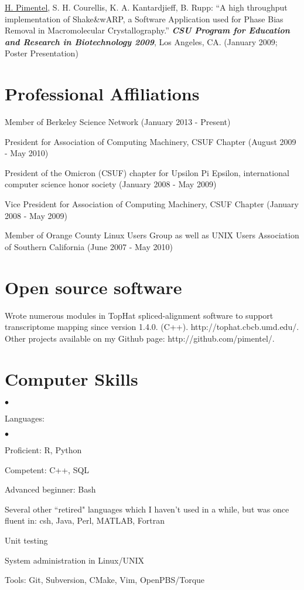 \documentclass[margin,line]{res}
\newenvironment{list2}{
  \begin{list}{$\bullet$}{%
      \setlength{\itemsep}{0in}
      \setlength{\parsep}{0in} \setlength{\parskip}{0in}
      \setlength{\topsep}{0in} \setlength{\partopsep}{0in} 
      \setlength{\leftmargin}{0.2in}}}{\end{list}}
\begin{document}
\begin{resume}
\underline{H. Pimentel}, S. H. Courellis, K. A. Kantardjieff, B. Rupp:
``A high throughput implementation of Shake\&wARP, a Software
Application used for Phase Bias Removal in Macromolecular
Crystallography.'' {\bf \emph{CSU Program for Education and Research
   in Biotechnology 2009}}, Los Angeles, CA. (January 2009; Poster Presentation)


\section{\sc Professional Affiliations}
Member of Berkeley Science Network
(January 2013 - Present) 

President for Association of Computing Machinery, CSUF Chapter
(August 2009 - May 2010) 

President of the Omicron (CSUF) chapter for Upsilon Pi Epsilon,
international computer science honor society (January 2008 - May 2009) 

Vice President for Association of Computing Machinery, CSUF Chapter
(January 2008 - May 2009) 

Member of Orange County Linux Users Group as well as UNIX Users
Association of Southern California (June 2007 - May 2010)

\section{\sc Open source software}
Wrote numerous modules in TopHat spliced-alignment software to support
transcriptome mapping since version 1.4.0. (C++). http://tophat.cbcb.umd.edu/.
Other projects available on my Github page: http://github.com/pimentel/.

\newpage
\section{\sc Computer Skills} 
\begin{list2}
\item Languages:
  \begin{list2}
    \item Proficient: R, Python
    \item Competent: C++, SQL
    \item Advanced beginner: Bash
  \end{list2}
\item Several other ``retired" languages which I haven't used in a while,
  but was once fluent in: csh, Java, Perl, MATLAB, Fortran
\item Unit testing
\item System administration in Linux/UNIX
\item Tools: Git, Subversion, CMake, Vim, OpenPBS/Torque\\ 
\end{list2}
\vspace{-.65cm}


\end{resume}
\end{document}
